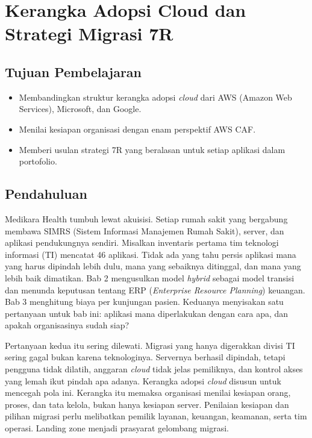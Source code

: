\chapter{Kerangka Adopsi Cloud dan Strategi Migrasi 7R}
\label{ch:ch04-adopsi}

\section*{Tujuan Pembelajaran}
\begin{itemize}
  \item Membandingkan struktur kerangka adopsi \textit{cloud} dari AWS (Amazon Web Services),
        Microsoft, dan Google.
  \item Menilai kesiapan organisasi dengan enam perspektif AWS CAF.
  \item Memberi usulan strategi 7R yang beralasan untuk setiap aplikasi dalam portofolio.
\end{itemize}

\section{Pendahuluan}

Medikara Health tumbuh lewat akuisisi. Setiap rumah sakit yang bergabung membawa SIMRS
(Sistem Informasi Manajemen Rumah Sakit), server, dan aplikasi pendukungnya sendiri.
Misalkan inventaris pertama tim teknologi informasi (TI) mencatat 46 aplikasi. Tidak ada
yang tahu persis aplikasi mana yang harus dipindah lebih dulu, mana yang sebaiknya
ditinggal, dan mana yang lebih baik dimatikan. Bab 2 mengusulkan model \textit{hybrid}
sebagai model transisi dan menunda keputusan tentang ERP (\textit{Enterprise Resource
Planning}) keuangan. Bab 3 menghitung biaya per kunjungan pasien. Keduanya menyisakan satu
pertanyaan untuk bab ini: aplikasi mana diperlakukan dengan cara apa, dan apakah
organisasinya sudah siap?

Pertanyaan kedua itu sering dilewati. Migrasi yang hanya digerakkan divisi TI sering gagal
bukan karena teknologinya. Servernya berhasil dipindah, tetapi pengguna tidak dilatih,
anggaran \textit{cloud} tidak jelas pemiliknya, dan kontrol akses yang lemah ikut pindah
apa adanya. Kerangka adopsi \textit{cloud} disusun untuk mencegah pola ini. Kerangka itu
memaksa organisasi menilai kesiapan orang, proses, dan tata kelola, bukan hanya kesiapan
server. Penilaian kesiapan dan pilihan migrasi perlu melibatkan pemilik layanan,
keuangan, keamanan, serta tim operasi. Landing zone menjadi prasyarat gelombang migrasi.

